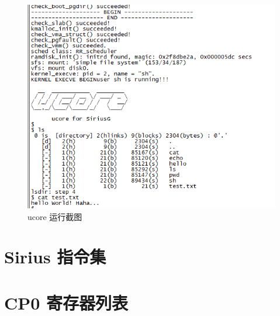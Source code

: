 \documentclass[blue,normal,cn,hide]{elegantbook}
\begin{document}
\begin{figure}[htpb]
    \centering
    \includegraphics[width=.6\textwidth]{figures/ucore}
    \caption{ucore 运行截图}
    \label{fig:ucore}
\end{figure}

\appendix

\chapter{Sirius 指令集}

\chapter{CP0 寄存器列表}



\end{document}
